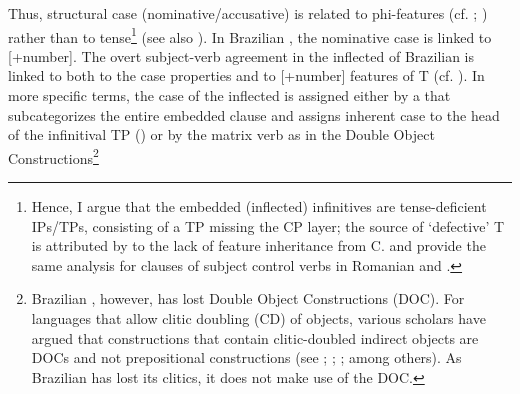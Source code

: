 \documentclass[output=paper]{langsci/langscibook}
\begin{document}
Thus, structural case (nominative\slash accusative) is related to phi-features (cf. \citealt{George1981}; \citealt{Sitaridou2006}) rather than to tense\footnote{Hence, I argue that the embedded (inflected) infinitives are tense-deficient IPs\slash TPs, consisting of a TP missing the CP layer; the source of ‘defective’ T is attributed by \citet{Chomsky2008} to the lack of feature inheritance from C. \citet{Alboiu2007} and \citet{Alexiadou2010} provide the same analysis for  clauses of subject control verbs in Romanian and .} (see also \citealt{Pires2007}). In Brazilian , the nominative case is linked to [+number]. The overt subject-verb agreement in the inflected  of Brazilian  is linked to both to the case properties and to [+number] features of T (cf. \citealt{Nunes1998}). In more specific terms, the case of the inflected  is assigned either by a  that subcategorizes the entire embedded clause and assigns inherent case to the head of the infinitival TP (\citealt{Hornstein2008}) or by the matrix verb as in the Double Object Constructions\footnote{Brazilian , however, has lost Double Object Constructions (DOC). For languages that allow clitic doubling (CD) of objects, various scholars have argued that constructions that contain clitic-doubled indirect objects are DOCs and not prepositional constructions (see \citealt{Demonte1995}; \citealt{Bleam1999}; \citealt{Anagnostopoulou2003}; among others). As Brazilian  has lost its clitics, it does not make use of the DOC. 

}
\end{document}
